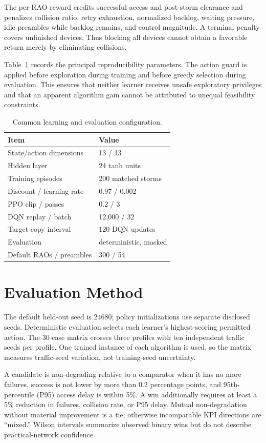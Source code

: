 \documentclass[conference]{IEEEtran}
\begin{document}
The per-RAO reward credits successful access and post-storm clearance and penalizes collision ratio, retry exhaustion, normalized backlog, waiting pressure, idle preambles while backlog remains, and control magnitude. A terminal penalty covers unfinished devices. Thus blocking all devices cannot obtain a favorable return merely by eliminating collisions.

Table~\ref{tab:config} records the principal reproducibility parameters. The action guard is applied before exploration during training and before greedy selection during evaluation. This ensures that neither learner receives unsafe exploratory privileges and that an apparent algorithm gain cannot be attributed to unequal feasibility constraints.

\begin{table}[t]
\caption{Common learning and evaluation configuration.}
\label{tab:config}
\centering\small
\begin{tabular}{ll}
\toprule
Item & Value\\
\midrule
State/action dimensions & 13 / 13\\
Hidden layer & 24 tanh units\\
Training episodes & 200 matched storms\\
Discount / learning rate & 0.97 / 0.002\\
PPO clip / passes & 0.2 / 3\\
DQN replay / batch & 12,000 / 32\\
Target-copy interval & 120 DQN updates\\
Evaluation & deterministic, masked\\
Default RAOs / preambles & 300 / 54\\
\bottomrule
\end{tabular}
\end{table}

\section{Evaluation Method}
The default held-out seed is 24680; policy initializations use separate disclosed seeds. Deterministic evaluation selects each learner's highest-scoring permitted action. The 30-case matrix crosses three profiles with ten independent traffic seeds per profile. One trained instance of each algorithm is used, so the matrix measures traffic-seed variation, not training-seed uncertainty.

A candidate is non-degrading relative to a comparator when it has no more failures, success is not lower by more than 0.2 percentage points, and 95th-percentile (P95) access delay is within 5\%. A win additionally requires at least a 5\% reduction in failures, collision rate, or P95 delay. Mutual non-degradation without material improvement is a tie; otherwise incomparable KPI directions are ``mixed.'' Wilson intervals summarize observed binary wins but do not describe practical-network confidence.
\end{document}
